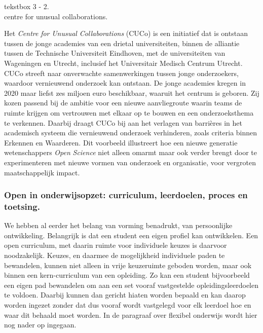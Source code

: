 \documentclass{jote-book}
\begin{document}
	\begin{bookbox}{\raggedright tekstbox 3 - 2. \\centre for unusual collaborations.}
		Het \emph{Centre }\emph{for}\emph{ }\emph{Unusual}\emph{ }\emph{Collaborations} (CUCo) is een initiatief dat is ontstaan tussen de jonge academies van een drietal universiteiten, binnen de alliantie tussen de Technische Universiteit Eindhoven, met de universiteiten van Wageningen en Utrecht, inclusief het Universitair Medisch Centrum Utrecht. CUCo streeft naar onverwachte samenwerkingen tussen jonge onderzoekers, waardoor vernieuwend onderzoek kan ontstaan. De jonge academies kregen in 2020 maar liefst zes miljoen euro beschikbaar, waaruit het centrum is geboren. Zij kozen passend bij de ambitie voor een nieuwe aanvliegroute waarin teams de ruimte krijgen om vertrouwen met elkaar op te bouwen en een onderzoeksthema te verkennen. Daarbij draagt CUCo bij aan het verlagen van barrières in het academisch systeem die vernieuwend onderzoek verhinderen, zoals criteria binnen Erkennen en Waarderen. Dit voorbeeld illustreert hoe een nieuwe generatie wetenschappers \emph{Open }\emph{Science} niet alleen omarmt maar ook verder brengt door te experimenteren met nieuwe vormen van onderzoek en organisatie, voor vergroten maatschappelijk impact.
	\end{bookbox}

	\subsubsection{Open in onderwijsopzet: curriculum, leerdoelen, proces en toetsing. }



	We hebben al eerder het belang van vorming benadrukt, van persoonlijke ontwikkeling. Belangrijk is dat een student een eigen profiel kan ontwikkelen. Een open curriculum, met daarin ruimte voor individuele keuzes is daarvoor noodzakelijk. Keuzes, en daarmee de mogelijkheid individuele paden te bewandelen, kunnen niet alleen in vrije keuzeruimte geboden worden, maar ook binnen een kern-curriculum van een opleiding. Zo kan een student bijvoorbeeld een eigen pad bewandelen om aan een set vooraf vastgestelde opleidingsleerdoelen te voldoen. Daarbij kunnen dan gericht hiaten worden bepaald en kan daarop worden ingezet zonder dat dus vooraf wordt vastgelegd voor elk leerdoel hoe en waar dit behaald moet worden. In de paragraaf over flexibel onderwijs wordt hier nog nader op ingegaan.
\end{document}
